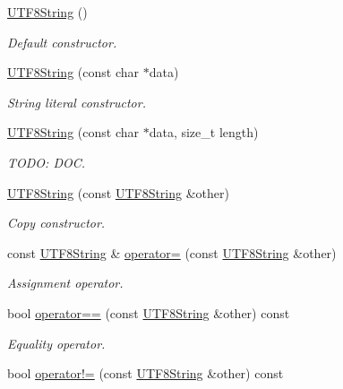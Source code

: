 \begin{DoxyCompactItemize}
\item 
\hyperlink{classchaos_1_1str_1_1_u_t_f8_string_a173513bf2d62d742bee337b00716bf82}{U\+T\+F8\+String} ()
\begin{DoxyCompactList}\small\item\em Default constructor. \end{DoxyCompactList}\item 
\hyperlink{classchaos_1_1str_1_1_u_t_f8_string_af506696bfe777057c4a7e6b6acf19dab}{U\+T\+F8\+String} (const char $\ast$data)
\begin{DoxyCompactList}\small\item\em String literal constructor. \end{DoxyCompactList}\item 
\hyperlink{classchaos_1_1str_1_1_u_t_f8_string_ac3077c0963a5f36dcaa2a87a1c02d05d}{U\+T\+F8\+String} (const char $\ast$data, size\+\_\+t length)
\begin{DoxyCompactList}\small\item\em T\+O\+D\+O\+: D\+O\+C. \end{DoxyCompactList}\item 
\hyperlink{classchaos_1_1str_1_1_u_t_f8_string_a194b76859245fdb815ce5d537f2e1db4}{U\+T\+F8\+String} (const \hyperlink{classchaos_1_1str_1_1_u_t_f8_string}{U\+T\+F8\+String} \&other)
\begin{DoxyCompactList}\small\item\em Copy constructor. \end{DoxyCompactList}\item 
const \hyperlink{classchaos_1_1str_1_1_u_t_f8_string}{U\+T\+F8\+String} \& \hyperlink{classchaos_1_1str_1_1_u_t_f8_string_a050b804cc8978a4a55a5bc0a8cad2553}{operator=} (const \hyperlink{classchaos_1_1str_1_1_u_t_f8_string}{U\+T\+F8\+String} \&other)
\begin{DoxyCompactList}\small\item\em Assignment operator. \end{DoxyCompactList}\item 
bool \hyperlink{classchaos_1_1str_1_1_u_t_f8_string_ae4446150398d498e8aa9ebbc05ca7b52}{operator==} (const \hyperlink{classchaos_1_1str_1_1_u_t_f8_string}{U\+T\+F8\+String} \&other) const 
\begin{DoxyCompactList}\small\item\em Equality operator. \end{DoxyCompactList}\item 
bool \hyperlink{classchaos_1_1str_1_1_u_t_f8_string_a166394399a4d200494b40e034aa330da}{operator!=} (const \hyperlink{classchaos_1_1str_1_1_u_t_f8_string}{U\+T\+F8\+String} \&other) const 

\end{DoxyCompactItemize}
